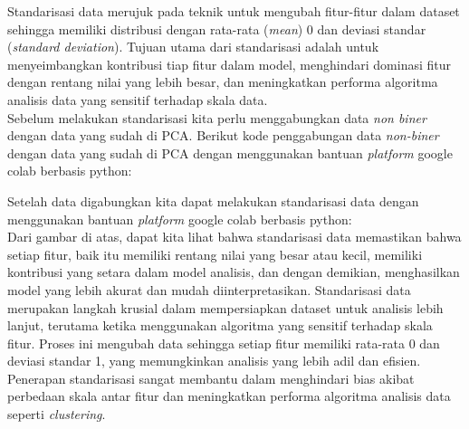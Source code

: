 \documentclass[english,12pt,a4paper,openany]{book}
\begin{document}
	Standarisasi data merujuk pada teknik untuk mengubah fitur-fitur dalam dataset sehingga memiliki distribusi dengan rata-rata (\textit{mean}) 0 dan deviasi standar (\textit{standard deviation}). Tujuan utama dari standarisasi adalah untuk menyeimbangkan kontribusi tiap fitur dalam model, menghindari dominasi fitur dengan rentang nilai yang lebih besar, dan meningkatkan performa algoritma analisis data yang sensitif terhadap skala data.\\
	
	Sebelum melakukan standarisasi kita perlu menggabungkan data \textit{non biner} dengan data yang sudah di PCA. Berikut kode penggabungan data \textit{non-biner} dengan data yang sudah di PCA dengan menggunakan bantuan\textit{ platform} google colab berbasis python:
	
	Setelah data digabungkan kita dapat melakukan standarisasi data dengan menggunakan bantuan \textit{platform} google colab berbasis python:\\
	Dari gambar di atas, dapat kita lihat bahwa standarisasi data memastikan bahwa setiap fitur, baik itu memiliki rentang nilai yang besar atau kecil, memiliki kontribusi yang setara dalam model analisis, dan dengan demikian, menghasilkan model yang lebih akurat dan mudah diinterpretasikan. Standarisasi data merupakan langkah krusial dalam mempersiapkan dataset untuk analisis lebih lanjut, terutama ketika menggunakan algoritma yang sensitif terhadap skala fitur. Proses ini mengubah data sehingga setiap fitur memiliki rata-rata 0 dan deviasi standar 1, yang memungkinkan analisis yang lebih adil dan efisien. Penerapan standarisasi sangat membantu dalam menghindari bias akibat perbedaan skala antar fitur dan meningkatkan performa algoritma analisis data seperti \textit{clustering}.
	
\end{document}

